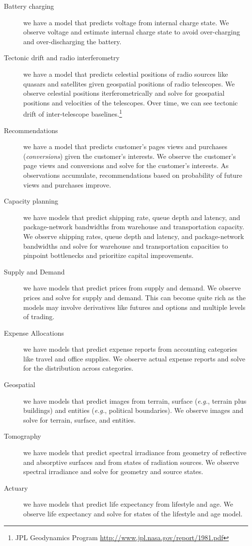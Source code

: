 \documentclass[10pt,oneside,x11names]{article}
\begin{document}
\begin{description}
\item[{Battery charging}] we have a model that predicts voltage from internal charge
state. We observe voltage and estimate internal charge state to avoid
over-charging and over-discharging the battery.
\item[{Tectonic drift and radio interferometry}] we have a model that predicts
celestial positions of radio sources like quasars and satellites given
geospatial positions of radio telescopes. We observe celestial positions
iterferometrically and solve for geospatial positions and velocities of the
telescopes. Over time, we can see tectonic drift of inter-telescope
baselines.\footnote{JPL Geodynamics Program \url{http://www.jpl.nasa.gov/report/1981.pdf}}
\item[{Recommendations}] we have a model that predicts customer's pages views and
purchases (\emph{conversions}) given the customer's interests. We observe the
customer's page views and conversions and solve for the customer's
interests. As observations accumulate, recommendations based on probability
of future views and purchases improve.
\item[{Capacity planning}] we have models that predict shipping rate, queue depth
and latency, and package-network bandwidths from warehouse and
transportation capacity. We observe shipping rates, queue depth and
latency, and package-network bandwidths and solve for warehouse and
transportation capacities to pinpoint bottlenecks and prioritize
capital improvements.
\item[{Supply and Demand}] we have models that predict prices from supply and
demand. We observe prices and solve for supply and demand. This can become
quite rich as the models may involve derivatives like futures and options
and multiple levels of trading.
\item[{Expense Allocations}] we have models that predict expense reports from
accounting categories like travel and office supplies. We observe actual
expense reports and solve for the distribution across categories.
\item[{Geospatial}] we have models that predict images from terrain, surface (\emph{e.g.},
terrain plus buildings) and entities (\emph{e.g.}, political boundaries). We
observe images and solve for terrain, surface, and entities.
\item[{Tomography}] we have models that predict spectral irradiance 
from geometry of reflective and absorptive surfaces and from
states of radiation sources. We observe spectral irradiance and solve for
geometry and source states.
\item[{Actuary}] we have models that predict life expectancy from lifestyle and age.
We observe life expectancy and solve for states of the
lifestyle and age model.
\end{description}
\end{document}

